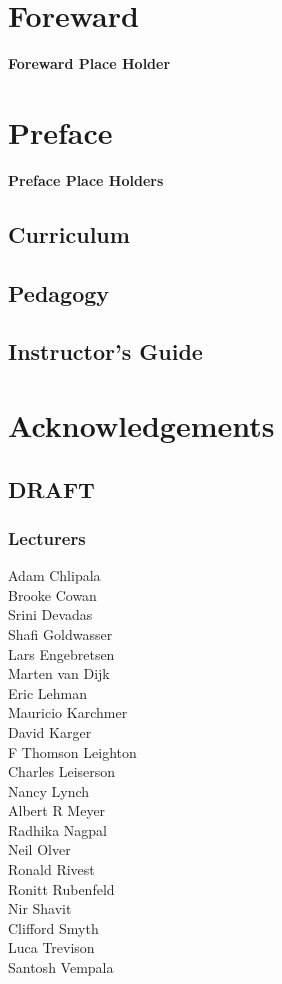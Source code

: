 \chapter*{Foreward}
\textbf{Foreward Place Holder}

\chapter*{Preface}

\textbf{Preface Place Holders}

\section*{Curriculum}

\section*{Pedagogy}

\section*{Instructor's Guide}

\chapter*{Acknowledgements}

\section*{DRAFT}

\subsection*{Lecturers}

Adam Chlipala\\
Brooke Cowan\\
Srini Devadas\\
Shafi Goldwasser\\
Lars Engebretsen\\
Marten van Dijk\\
Eric Lehman\\
Mauricio Karchmer\\
David Karger\\
F Thomson Leighton\\
Charles Leiserson\\
Nancy Lynch\\
Albert R Meyer\\
Radhika Nagpal\\
Neil Olver\\
Ronald Rivest\\
Ronitt Rubenfeld\\
Nir Shavit\\
Clifford Smyth\\
Luca Trevison\\
Santosh Vempala

